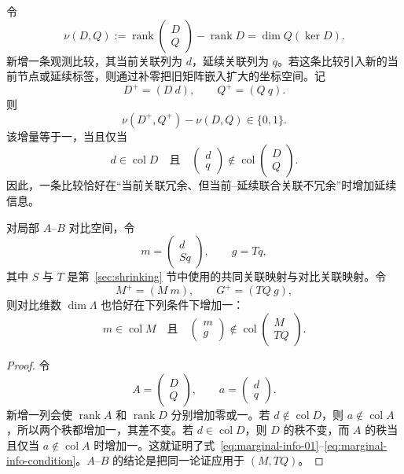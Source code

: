 \begin{theorem}[新增一条比较带来的秩增量]
\label{thm:marginal-edge}
令
\[
\nu(D,Q)
:=
\operatorname{rank}
\begin{pmatrix}
D\\Q
\end{pmatrix}
-
\operatorname{rank}D
=
\dim Q(\ker D).
\]
新增一条观测比较，其当前关联列为 $d$，延续关联列为 $q$。若这条比较引入新的当前节点或延续标签，则通过补零把旧矩阵嵌入扩大的坐标空间。记
\[
D^+=(D\ d),
\qquad
Q^+=(Q\ q).
\]
则
\begin{equation}
\boxed{
\nu(D^+,Q^+)-\nu(D,Q)\in\{0,1\}.}
\label{eq:marginal-info-01}
\end{equation}
该增量等于一，当且仅当
\begin{equation}
\boxed{
d\in\operatorname{col}D
\quad\text{且}\quad
\begin{pmatrix}d\\q\end{pmatrix}
\notin
\operatorname{col}
\begin{pmatrix}D\\Q\end{pmatrix}.}
\label{eq:marginal-info-condition}
\end{equation}
因此，一条比较恰好在“当前关联冗余、但当前--延续联合关联不冗余”时增加延续信息。

对局部 $A$--$B$ 对比空间，令
\[
m=
\begin{pmatrix}d\\Sq\end{pmatrix},
\qquad
g=Tq,
\]
其中 $S$ 与 $T$ 是第~\ref{sec:shrinking} 节中使用的共同关联映射与对比关联映射。令
\[
M^+=(M\ m),
\qquad
G^+=(TQ\ g),
\]
则对比维数 $\dim\Lambda$ 也恰好在下列条件下增加一：
\begin{equation}
m\in\operatorname{col}M
\quad\text{且}\quad
\begin{pmatrix}m\\g\end{pmatrix}
\notin
\operatorname{col}
\begin{pmatrix}M\\TQ\end{pmatrix}.
\label{eq:marginal-gap-condition}
\end{equation}
\end{theorem}

\begin{proof}
令
\[
A=
\begin{pmatrix}D\\Q\end{pmatrix},
\qquad
a=
\begin{pmatrix}d\\q\end{pmatrix}.
\]
新增一列会使 $\operatorname{rank}A$ 和 $\operatorname{rank}D$ 分别增加零或一。若 $d\notin\operatorname{col}D$，则 $a\notin\operatorname{col}A$，所以两个秩都增加一，其差不变。若 $d\in\operatorname{col}D$，则 $D$ 的秩不变，而 $A$ 的秩当且仅当 $a\notin\operatorname{col}A$ 时增加一。这就证明了式~\eqref{eq:marginal-info-01}--\eqref{eq:marginal-info-condition}。$A$--$B$ 的结论是把同一论证应用于 $(M,TQ)$。
\end{proof}


